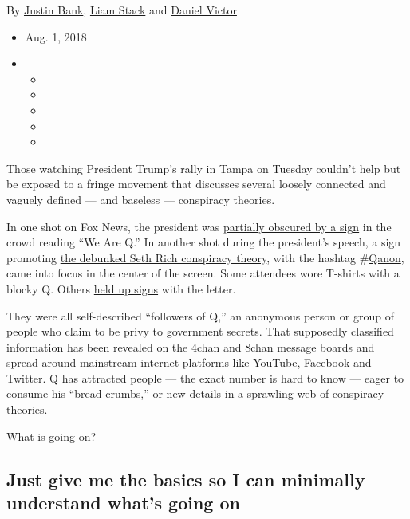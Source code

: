 By \href{https://www.nytimes.com/by/justin-bank}{Justin Bank},
\href{https://www.nytimes.com/by/liam-stack}{Liam Stack} and
\href{https://www.nytimes.com/by/daniel-victor}{Daniel Victor}

\begin{itemize}
\item
  Aug. 1, 2018
\item
  \begin{itemize}
  \item
  \item
  \item
  \item
  \item
  \end{itemize}
\end{itemize}

Those watching President Trump's rally in Tampa on Tuesday couldn't help
but be exposed to a fringe movement that discusses several loosely
connected and vaguely defined --- and baseless --- conspiracy theories.

In one shot on Fox News, the president was
\href{https://twitter.com/AndrewKirell/status/1024438025391099904?ref_src=twsrc\%5Etfw\%7Ctwcamp\%5Etweetembed\%7Ctwterm\%5E1024438025391099904\&ref_url=https\%3A\%2F\%2Fsplinternews.com\%2Fajax\%2Finset\%2Fiframe\%3Fid\%3Dtwitter-1024438025391099904\%26autosize\%3D1}{partially
obscured by a sign} in the crowd reading ``We Are Q.'' In another shot
during the president's speech, a sign promoting
\href{https://www.nytimes.com/2018/03/13/business/fox-news-seth-rich-lawsuit.html}{the
debunked Seth Rich conspiracy theory}, with the hashtag
\#\href{https://www.nytimes.com/2020/07/14/us/politics/qanon-politicians-candidates.html}{Qanon},
came into focus in the center of the screen. Some attendees wore
T-shirts with a blocky Q. Others
\href{https://twitter.com/drunkintheam/status/1024449381414522880}{held
up signs} with the letter.

They were all self-described ``followers of Q,'' an anonymous person or
group of people who claim to be privy to government secrets. That
supposedly classified information has been revealed on the 4chan and
8chan message boards and spread around mainstream internet platforms
like YouTube, Facebook and Twitter. Q has attracted people --- the exact
number is hard to know --- eager to consume his ``bread crumbs,'' or new
details in a sprawling web of conspiracy theories.

What is going on?

\hypertarget{just-give-me-the-basics-so-i-can-minimally-understand-whats-going-on}{%
\subsection{Just give me the basics so I can minimally understand what's
going
on}\label{just-give-me-the-basics-so-i-can-minimally-understand-whats-going-on}}

